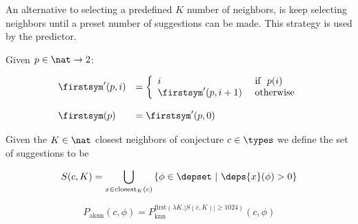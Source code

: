 
An alternative to selecting a predefined $K$ number of neighbors, is keep selecting neighbors until a preset number of suggestions can be made.
This strategy is used by the \knnadaptive predictor.

\begin{definition}\label{def:first}
  Given $p \in \nat \rightarrow 2$:

  $$
    \begin{array}{ll}
      \firstsym'(p, i) & = \left\{
      \begin{array}{ll}
         i & ~\text{if}~~ p(i) \\
         \firstsym'(p, i+1) & ~\text{otherwise} \\
      \end{array}
      \right. \\
      \\
      \firstsym(p) & = \firstsym'(p, 0)
    \end{array}
  $$
\end{definition}

\begin{definition}
  Given the $K \in \nat$ closest neighbors of conjecture $c \in \types$ we define the set of suggestions to be

  $$
    S(c, K) = \bigcup_{x \in \text{closest}_K(c)} \left\{ \phi \in \depset ~|~ \deps{x}(\phi) > 0 \right\}
  $$
\end{definition}

\begin{definition}
  $$
    P_\text{aknn}(c, \phi) = P^{\text{first}(\lambda K . |S(c, K)| \geq 1024)}_\text{knn}(c, \phi)
  $$
\end{definition}

